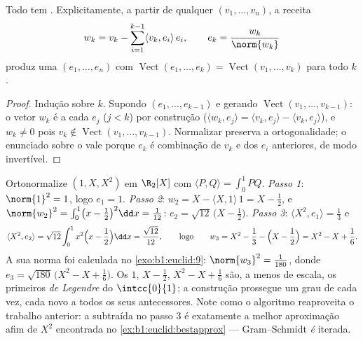 \begin{theorem}\label{thm:b1:euclid:gramschmidt}
Todo  tem  . Explicitamente, a
partir de qualquer  $(v_1, \dots, v_n)$, a receita
\[
w_k = v_k - \sum_{i=1}^{k-1} \langle v_k, e_i\rangle\, e_i ,
\qquad
e_k = \frac{w_k}{\norm{w_k}}
\]
produz uma   $(e_1, \dots, e_n)$ com $\operatorname{Vect}(e_1, \dots, e_k) = \operatorname{Vect}(v_1,
\dots, v_k)$ para todo $k$.
\end{theorem}

\begin{proof}
Indução sobre $k$. Supondo $(e_1, \dots, e_{k-1})$  e gerando $\operatorname{Vect}(v_1, \dots, v_{k-1})$: o vetor
$w_k$ é  a cada $e_j$ ($j < k$) por construção ($\langle w_k, e_j \rangle = \langle v_k, e_j\rangle - \langle v_k,
e_j\rangle$), e
$w_k \neq 0$ pois $v_k \notin
\operatorname{Vect}(v_1, \dots, v_{k-1})$. Normalizar preserva a ortogonalidade; o enunciado
sobre o  vale porque $e_k$ é combinação de $v_k$ e dos
$e_i$ anteriores, de modo invertível.
\end{proof}

\begin{example}
\label{ex:b1:euclid:legendre}
Ortonormalize $(1, X, X^2)$ em $\R_2[X]$ com $\langle P,
Q\rangle = \int_0^1 PQ$. \emph{Passo 1}: $\norm{1}^2 = 1$,
logo $e_1 = 1$. \emph{Passo 2}: $w_2 = X - \langle X, 1\rangle\,1 = X -
\frac12$, e $\norm{w_2}^2 = \int_0^1\bigl(x - \frac12\bigr)^2
\dd x = \frac1{12}$: $e_2 = \sqrt{12}\,\bigl(X - \frac12\bigr)$.
\emph{Passo 3}: $\langle X^2, e_1\rangle = \frac13$ e
\[
\langle X^2, e_2\rangle
= \sqrt{12}\int_0^1 x^2\Bigl(x - \frac12\Bigr)\dd x
= \frac{\sqrt{12}}{12},
\qquad\text{logo}\qquad
w_3 = X^2 - \frac13 - \Bigl(X - \frac12\Bigr)
= X^2 - X + \frac16 .
\]
A sua norma foi calculada no \cref{exo:b1:euclid:9}: $\norm{w_3}^2 =
\frac1{180}$, donde $e_3 = \sqrt{180}\,\bigl(X^2 - X +
\frac16\bigr)$. Os
 $1$, $X - \frac12$, $X^2 - X +
\frac16$ são, a menos de escala, os primeiros
\emph{ de Legendre} do  $\intcc{0}{1}$; a construção
prossegue um grau de cada vez, cada novo   a todos
os seus antecessores. Note como o algoritmo reaproveita o trabalho
anterior: a  subtraída no passo 3 é exatamente a melhor
aproximação afim de $X^2$ encontrada no \cref{ex:b1:euclid:bestapprox} --- Gram--Schmidt
\emph{é}  iterada.
\end{example}

